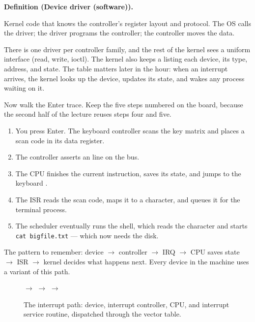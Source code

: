 \documentclass[11pt]{article}
\newenvironment{definitionbox}[1]{%
  \par\noindent\textbf{Definition (#1).}\ \itshape
}{\par\vspace{0.3em}}
\begin{document}
\begin{definitionbox}{Device driver (software)}
Kernel code that knows the controller's register layout and protocol. The OS
calls the driver; the driver programs the controller; the controller moves the
data.
\end{definitionbox}

There is one driver per controller family, and the rest of the kernel sees a
uniform interface (read, write, ioctl). The kernel also keeps a
 listing each device, its type, address, and state. The
table matters later in the hour: when an interrupt arrives, the kernel looks up
the device, updates its state, and wakes any process waiting on it.

Now walk the Enter trace. Keep the five steps numbered on the board, because the
second half of the lecture reuses steps four and five.

\begin{enumerate}
  \item You press Enter. The keyboard controller scans the key matrix and places
    a scan code in its data register.
  \item The controller asserts an  line on the bus.
  \item The CPU finishes the current instruction, saves its state, and jumps to
    the keyboard .
  \item The ISR reads the scan code, maps it to a character, and queues it for
    the terminal process.
  \item The scheduler eventually runs the shell, which reads the character and
    starts \texttt{cat bigfile.txt} --- which now needs the disk.
\end{enumerate}

The pattern to remember: device $\to$ controller $\to$ IRQ $\to$ CPU saves state
$\to$ ISR $\to$ kernel decides what happens next. Every device in the machine
uses a variant of this path.

\begin{figure}[ht]
\centering
\small
{}\;
$\longrightarrow$\;
\;
$\longrightarrow$\;
\;
$\longrightarrow$\;
\\[0.4em]
\caption{The interrupt path: device, interrupt controller, CPU, and interrupt
service routine, dispatched through the vector table.}
\label{fig:interrupt-path}
\end{figure}
\end{document}
